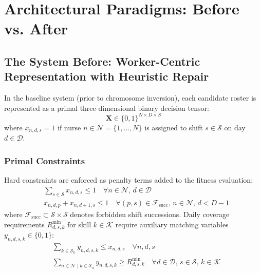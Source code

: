 \documentclass[10pt,journal,compsoc]{IEEEtran}
\begin{document}
\section{Architectural Paradigms: Before vs. After}
\label{sec:architecture}

\subsection{The System Before: Worker-Centric Representation with Heuristic Repair}
In the baseline system (prior to chromosome inversion), each candidate roster is represented as a primal three-dimensional binary decision tensor:
\begin{equation}
\mathbf{X} \in \{0, 1\}^{N \times D \times S}
\end{equation}
where $x_{n,d,s} = 1$ if nurse $n \in \mathcal{N} = \{1, \dots, N\}$ is assigned to shift $s \in \mathcal{S}$ on day $d \in \mathcal{D}$.

\subsubsection{Primal Constraints}
Hard constraints are enforced as penalty terms added to the fitness evaluation:
\begin{align}
& \sum_{s \in \mathcal{S}} x_{n,d,s} \le 1 \quad \forall n \in \mathcal{N}, \, d \in \mathcal{D} \label{eq:hc3_single_shift} \\
& x_{n,d,p} + x_{n,d+1,s} \le 1 \quad \forall (p, s) \in \mathcal{F}_{\text{succ}}, \, n \in \mathcal{N}, \, d < D-1 \label{eq:hc4_forbidden_succ}
\end{align}
where $\mathcal{F}_{\text{succ}} \subset \mathcal{S} \times \mathcal{S}$ denotes forbidden shift successions. Daily coverage requirements $R_{d,s,k}^{\min}$ for skill $k \in \mathcal{K}$ require auxiliary matching variables $y_{n,d,s,k} \in \{0, 1\}$:
\begin{align}
& \sum_{k \in \mathcal{S}_n} y_{n,d,s,k} \le x_{n,d,s} \quad \forall n, d, s \label{eq:hc2_skill_link} \\
& \sum_{n \in \mathcal{N} \mid k \in \mathcal{S}_n} y_{n,d,s,k} \ge R_{d,s,k}^{\min} \quad \forall d \in \mathcal{D}, \, s \in \mathcal{S}, \, k \in \mathcal{K} \label{eq:hc1_coverage}
\end{align}
\end{document}
